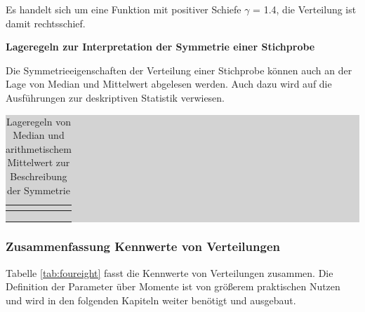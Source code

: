 \noindent Es handelt sich um eine Funktion mit positiver Schiefe $\gamma$ = 1.4, die Verteilung ist damit rechtsschief.

\clearpage

{\selectfont
\noindent\textbf{Lageregeln zur Interpretation der Symmetrie einer Stichprobe}}\smallskip

\noindent Die Symmetrieeigenschaften der Verteilung einer Stichprobe k\"{o}nnen auch an der Lage von Median und Mittelwert abgelesen werden. Auch dazu wird auf die Ausf\"{u}hrungen zur deskriptiven Statistik verwiesen. 

\begin{table}[H]
\setlength{\arrayrulewidth}{.1em}
\caption{Lageregeln von Median und arithmetischem Mittelwert zur Beschreibung der Symmetrie}
\setlength{\fboxsep}{0pt}%
\colorbox{lightgray}{%
%
\begin{tabular}{| c | c |}
\hline
\parbox[c][0.3in][c]{3.3in}{\smallskip\centering\textbf{\selectfont{Lagekennwerte}}} & 
\parbox[c][0.3in][c]{3.3in}{\smallskip\centering\textbf{\selectfont{Symmetrieeigenschaft}}}\\ \hline


\parbox[c][0.3in][c]{3.3in}{\centering{}} & 
\parbox[c][0.3in][c]{3.3in}{\centering{}\selectfont{Rechtsschiefe Verteilung}} \\
\hline

\parbox[c][0.3in][c]{3.3in}{\centering{}} & 
\parbox[c][0.3in][c]{3.3in}{\centering{}\selectfont{Symmetrische Verteilung}} \\
\hline

\parbox[c][0.3in][c]{3.3in}{\centering{}} & 
\parbox[c][0.3in][c]{3.3in}{\centering{}\selectfont{Linksschiefe Verteilung}} \\
\hline

\end{tabular}%
}
\label{tab:fourseven}
\end{table}

\clearpage

\subsubsection{Zusammenfassung Kennwerte von Verteilungen}

\noindent Tabelle \ref{tab:foureight} fasst die Kennwerte von Verteilungen zusammen. Die Definition der Parameter \"{u}ber Momente ist von gr\"{o}{\ss}erem praktischen Nutzen und wird in den folgenden Kapiteln weiter ben\"{o}tigt und ausgebaut.

